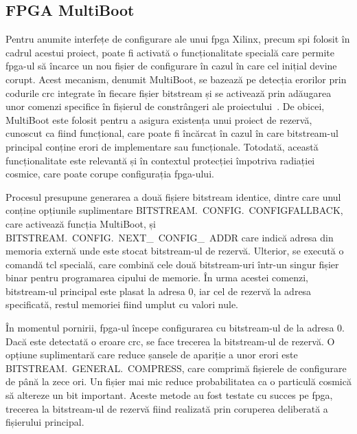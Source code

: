 \documentclass[12pt,a4paper]{report}
\begin{document}
\subsection{FPGA MultiBoot}
Pentru anumite interfețe de configurare ale unui \gls{fpga} Xilinx, precum \gls{spi} folosit în cadrul acestui proiect, poate fi activată o funcționalitate specială care permite \gls{fpga}-ul să încarce un nou fișier de configurare în cazul în care cel inițial devine corupt. Acest mecanism, denumit MultiBoot, se bazează pe detecția erorilor prin codurile \gls{crc} integrate în fiecare fișier bitstream și se activează prin adăugarea unor comenzi specifice în fișierul de constrângeri ale proiectului~\cite{xapp1247}. De obicei, MultiBoot este folosit pentru a asigura existența unui proiect de rezervă, cunoscut ca fiind funcțional, care poate fi încărcat în cazul în care bitstream-ul principal conține erori de implementare sau funcționale. Totodată, această funcționalitate este relevantă și în contextul protecției împotriva radiației cosmice, care poate corupe configurația \gls{fpga}-ului.

Procesul presupune generarea a două fișiere bitstream identice, dintre care unul conține opțiunile suplimentare BITSTREAM.\allowbreak\ CONFIG.\allowbreak\ CONFIGFALLBACK, care activează funcția MultiBoot, și BITSTREAM.\allowbreak\ CONFIG.\allowbreak\ NEXT\_\allowbreak\ CONFIG\_\allowbreak\ ADDR care indică adresa din memoria externă unde este stocat bitstream-ul de rezervă. Ulterior, se execută o comandă tcl specială, care combină cele două bitstream-uri într-un singur fișier binar pentru programarea cipului de memorie. În urma acestei comenzi, bitstream-ul principal este plasat la adresa 0, iar cel de rezervă la adresa specificată, restul memoriei fiind umplut cu valori nule. 

În momentul pornirii, \gls{fpga}-ul începe configurarea cu bitstream-ul de la adresa 0. Dacă este detectată o eroare \gls{crc}, se face trecerea la bitstream-ul de rezervă. O opțiune suplimentară care reduce șansele de apariție a unor erori este BITSTREAM.\allowbreak\ GENERAL.\allowbreak\ COMPRESS, care comprimă fișierele de configurare de până la zece ori. Un fișier mai mic reduce probabilitatea ca o particulă cosmică să altereze un bit important. Aceste metode au fost testate cu succes pe \gls{fpga}, trecerea la bitstream-ul de rezervă fiind realizată prin coruperea deliberată a fișierului principal.
\end{document}
